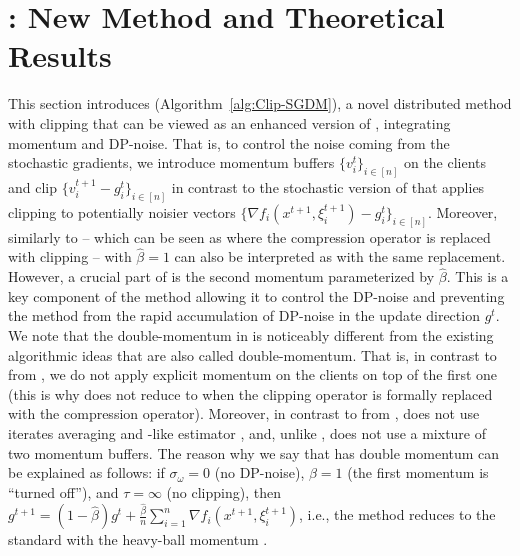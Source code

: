 \documentclass[a4paper,11pt]{article}
\begin{document}
\section{: New Method and Theoretical Results}





This section introduces  (Algorithm~\ref{alg:Clip-SGDM}), a novel distributed method with clipping that can be viewed as an enhanced version of , integrating momentum and DP-noise. That is, to control the noise coming from the stochastic gradients, we introduce momentum buffers $\{v_i^{t}\}_{i\in [n]}$ on the clients and clip $\{v_i^{t+1} - g_i^t\}_{i\in[n]}$ in contrast to the stochastic version of  that applies clipping to potentially noisier vectors $\{\nabla f_i(x^{t+1}, \xi_i^{t+1}) - g_i^t\}_{i\in[n]}$. Moreover, similarly to  -- which can be seen as  \citep{richtarik2021ef21} where the compression operator is replaced with clipping --  with $\hat\beta = 1$ can also be interpreted as  \citep{fatkhullin2024momentum} with the same replacement. However, a crucial part of  is the second momentum parameterized by $\hat\beta$. This is a key component of the method allowing it to control the DP-noise and preventing the method from the rapid accumulation of DP-noise in the update direction $g^t$. We note that the double-momentum in  is noticeably different from the existing algorithmic ideas that are also called double-momentum. That is, in contrast to  from \citep{fatkhullin2024momentum}, we do not apply explicit momentum on the clients on top of the first one (this is why  does not reduce to  when the clipping operator is formally replaced with the compression operator). Moreover, in contrast to  from \citep{levy2023stable},  does not use iterates averaging and -like estimator \citep{cutkosky2019momentum}, and, unlike  \citep{pagliardini2024ademamix},  does not use a mixture of two momentum buffers. The reason why we say that  has double momentum can be explained as follows: if $\sigma_\omega = 0$ (no DP-noise), $\beta = 1$ (the first momentum is ``turned off''), and $\tau = \infty$ (no clipping), then $g^{t+1} = (1-\hat\beta)g^t + \frac{\hat\beta}{n}\sum_{i=1}^n \nabla f_i(x^{t+1}, \xi_i^{t+1})$, i.e., the method reduces to the standard  with the heavy-ball momentum \citep{polyak1964some}. 
\end{document}
